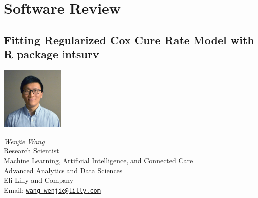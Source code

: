 \documentclass{report}
\newcommand{\pkg}[1]{{\fontseries{b}\selectfont #1}}
\newcommand{\email}[1]{\href{mailto:#1}{\normalfont\texttt{#1}}}
\begin{document}
\section*{Software Review}
\subsection*{Fitting Regularized Cox Cure Rate Model with R package
  \pkg{intsurv}}



\medskip

\noindent
\begin{minipage}[b]{1.2in}\centering
  \includegraphics[width=1.2in, trim={{0.08\wd0} {0.08\ht0} {0.08\wd0}
    {0.08\ht0}}, clip=true]{WenjieWang}\\
\end{minipage}
\hspace{0.2cm}
\begin{minipage}[b]{2.4in}
\begin{flushright}
  \emph{Wenjie Wang}\\
  Research Scientist\\
  Machine Learning, Artificial Intelligence, and Connected Care\\
  Advanced Analytics and Data Sciences\\
  Eli Lilly and Company\\
  Email: \email{wang\_wenjie@lilly.com}
\end{flushright}
\end{minipage}
\end{document}
